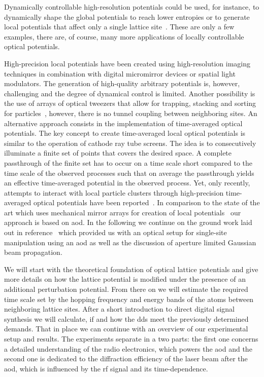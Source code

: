 Dynamically controllable high-resolution potentials could be used, for
instance, to dynamically shape the global potentials to reach lower entropies
or to generate local potentials that affect only a single lattice
site~\cite{Ho2009,Bernier2009,Mazurenko2017}. These are only a few examples,
there are, of course, many more applications of locally controllable optical
potentials.

High-precision local potentials have been created using high-resolution
imaging techniques in combination with digital micromirror devices or spatial
light modulators. The generation of high-quality arbitrary potentials is,
however, challenging and the degree of dynamical control is limited. Another
possibility is the use of arrays of optical tweezers that allow for trapping,
stacking and sorting for particles~\cite{Roxworthy2012}, however, there is no
tunnel coupling between neighboring sites. An alternative approach consists in
the implementation of time-averaged optical potentials. The key concept to
create time-averaged local optical potentials is similar to the operation of
cathode ray tube screens. The idea is to consecutively illuminate a finite
set of points that covers the desired space. A complete passthrough of the
finite set has to occur on a time scale short compared to the time scale
of the observed processes such that on average the passthrough yields an
effective time-averaged potential in the observed process. Yet, only recently,
attempts to interact with local particle clusters through high-precision
time-averaged optical potentials have been reported~\cite{Roy2016}.
In comparison to the state of the art which uses mechanical mirror arrays for
creation of local potentials~\cite{Roy2016} our approach is based on
\gls{aod}. In the following we continue on the ground work laid out in
reference~\cite{Hertlein2017} which provided us with an optical setup for
single-site manipulation using an \gls{aod} as well as the discussion of
aperture limited Gaussian beam propagation.

We will start with the theoretical foundation of optical lattice potentials
and give more details on how the lattice potential is modified under the
presence of an additional perturbation potential. From there on we will
estimate the required time scale set by the hopping frequency and energy bands
of the atoms between neighboring lattice sites. After a short introduction
to direct digital signal synthesis we will calculate, if and how the \gls{dds}
meet the previously determined demands. That in place we can continue with
an overview of our experimental setup and results. The experiments separate in
a two parts: the first one concerns a detailed understanding of the radio
electronics, which powers the \gls{aod} and the second one is dedicated to the
diffraction efficiency of the laser beam after the \gls{aod}, which is
influenced by the \gls{rf} signal and its time-dependence.
